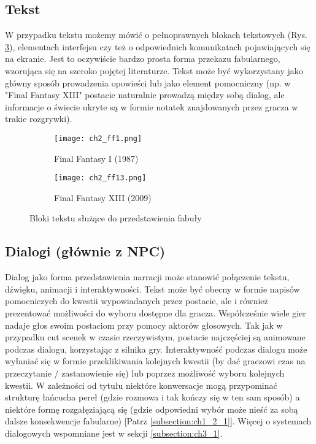 \newpage

\subsection{Tekst}

W przypadku tekstu możemy mówić o pełnoprawnych blokach tekstowych (Rys. \ref{fig:ch1_2_2_text}),
elementach interfejsu czy też o odpowiednich komunikatach pojawiających się na ekranie. Jest to
oczywiście bardzo prosta forma przekazu fabularnego, wzorująca się na szeroko pojętej literaturze.
Tekst może być wykorzystany jako główny sposób prowadzenia opowieści lub jako element pomocniczny
(np. w "Final Fantasy XIII" postacie naturalnie prowadzą między sobą dialog,
ale informacje o świecie ukryte są w formie notatek znajdowanych przez gracza w trakie rozgrywki).

\begin{figure}[h]
    \begin{subfigure}{0.49\textwidth}
        \texttt{[image: ch2\_ff1.png]}
        \caption{Final Fantasy I (1987)}
        \label{subfig:ch2_2_text1}
    \end{subfigure}
    \begin{subfigure}{0.49\textwidth}
        \texttt{[image: ch2\_ff13.png]}
        \caption{Final Fantasy XIII (2009)}
        \label{subfig:ch2_2_text2}
    \end{subfigure}
    \caption{Bloki tekstu służące do przedstawienia fabuły}
    \label{fig:ch1_2_2_text}
\end{figure}

\subsection{Dialogi (głównie z NPC)}

Dialog jako forma przedstawienia narracji może stanowić połączenie tekstu, dźwięku, animacji i
interaktywności. Tekst może być obecny w formie napisów pomocniczych do kwestii wypowiadanych przez
postacie, ale i również prezentować możliwości do wyboru dostępne dla gracza. Współcześnie wiele gier
nadaje głos swoim postaciom przy pomocy aktorów głosowych. Tak jak w przypadku cut scenek w czasie
rzeczywistym, postacie najczęściej są animowane podczas dialogu, korzystając z silnika gry.
Interaktywność podczas dialogu może wyłaniać się w formie przeklikiwania kolejnych kwestii (by dać
graczowi czas na przeczytanie / zastanowienie się) lub poprzez możliwość wyboru kolejnych kwestii.
W zależności od tytułu niektóre konwersacje mogą przypominać strukturę łańcucha pereł (gdzie
rozmowa i tak kończy się w ten sam sposób) a niektóre formę rozgałęziającą się (gdzie odpowiedni
wybór może nieść za sobą dalsze konsekwencje fabularne) [Patrz \ref{subsection:ch1_2_1}]. Więcej
o systemach dialogowych wspomniane jest w sekcji \ref{subsection:ch3_1}.


